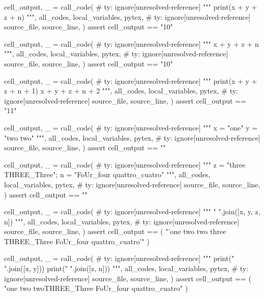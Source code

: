 \documentclass[oneside]{book}
\begin{document}
\begin{pycell}
cell_output, _ = call_code(  # ty: ignore[unresolved-reference]
    """
print(x + y + z + n)
""",
    all_codes,
    local_variables,
    pytex,  # ty: ignore[unresolved-reference]
    source_file,
    source_line,
)
assert cell_output == "10"
\end{pycell}

\begin{pycell}
cell_output, _ = call_code(  # ty: ignore[unresolved-reference]
    """
x + y + z + n
""",
    all_codes,
    local_variables,
    pytex,  # ty: ignore[unresolved-reference]
    source_file,
    source_line,
)
assert cell_output == "10"
\end{pycell}

\begin{pycell}
cell_output, _ = call_code(  # ty: ignore[unresolved-reference]
    """
print(x + y + z + n + 1)
x + y + z + n + 2
""",
    all_codes,
    local_variables,
    pytex,  # ty: ignore[unresolved-reference]
    source_file,
    source_line,
)
assert cell_output == "11"
\end{pycell}

\begin{pycell}
cell_output, _ = call_code(  # ty: ignore[unresolved-reference]
    """
x = "one"
y = "two two"
""",
    all_codes,
    local_variables,
    pytex,  # ty: ignore[unresolved-reference]
    source_file,
    source_line,
)
assert cell_output == ""
\end{pycell}

\begin{pycell}
cell_output, _ = call_code(  # ty: ignore[unresolved-reference]
    """
z = "three THREE_Three"; n = "FoUr_four quattro_cuatro"
""",
    all_codes,
    local_variables,
    pytex,  # ty: ignore[unresolved-reference]
    source_file,
    source_line,
)
assert cell_output == ""
\end{pycell}

\begin{pycell}
cell_output, _ = call_code(  # ty: ignore[unresolved-reference]
    """
" ".join([x, y, z, n])
""",
    all_codes,
    local_variables,
    pytex,  # ty: ignore[unresolved-reference]
    source_file,
    source_line,
)
assert cell_output == (
    "'one two two three THREE_Three FoUr_four quattro_cuatro'"
)
\end{pycell}

\begin{pycell}
cell_output, _ = call_code(  # ty: ignore[unresolved-reference]
    """
print(" ".join([x, y]))
print(" ".join([z, n]))
""",
    all_codes,
    local_variables,
    pytex,  # ty: ignore[unresolved-reference]
    source_file,
    source_line,
)
assert cell_output == (
    "one two two\nthree THREE_Three FoUr_four quattro_cuatro"
)
\end{pycell}
\end{document}
